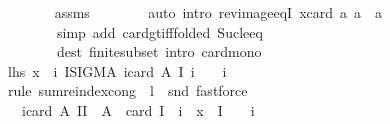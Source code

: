 \begin{isabellebody}
\ \ \ \ \ \ \isamarkupfalse%
\ assms\isanewline
\ \ \ \ \ \ \isamarkupfalse%
\ {\isacharparenleft}{\kern0pt}auto\ intro{\isacharbang}{\kern0pt}{\isacharcolon}{\kern0pt}\ rev{\isacharunderscore}{\kern0pt}image{\isacharunderscore}{\kern0pt}eqI{\isacharbrackleft}{\kern0pt}\ x{\isacharequal}{\kern0pt}{\isachardoublequoteopen}{\isacharparenleft}{\kern0pt}card\ a{\isacharcomma}{\kern0pt}\ a{\isacharparenright}{\kern0pt}{\isachardoublequoteclose}\ \ a{\isacharbrackright}{\kern0pt}\isanewline
\ \ \ \ \ \ \ \ simp\ add{\isacharcolon}{\kern0pt}\ card{\isacharunderscore}{\kern0pt}gt{\isacharunderscore}{\kern0pt}{}{\isacharunderscore}{\kern0pt}iff{\isacharbrackleft}{\kern0pt}folded\ Suc{\isacharunderscore}{\kern0pt}le{\isacharunderscore}{\kern0pt}eq{\isacharbrackright}{\kern0pt}\isanewline
\ \ \ \ \ \ \ \ dest{\isacharcolon}{\kern0pt}\ finite{\isacharunderscore}{\kern0pt}subset\ intro{\isacharcolon}{\kern0pt}\ card{\isacharunderscore}{\kern0pt}mono{\isacharparenright}{\kern0pt}\isanewline
\ \ \ \ \isamarkupfalse%
\ \isamarkupfalse%
\ {\isachardoublequoteopen}{\isacharquery}{\kern0pt}lhs\ x\ {\isacharequal}{\kern0pt}\ {\isacharparenleft}{\kern0pt}{\isasymSum}{\isacharparenleft}{\kern0pt}i{\isacharcomma}{\kern0pt}\ I{\isacharparenright}{\kern0pt}{\isasymin}{\isacharparenleft}{\kern0pt}SIGMA\ i{\isacharcolon}{\kern0pt}{\isacharbraceleft}{\kern0pt}{}{\isachardot}{\kern0pt}{\isachardot}{\kern0pt}card\ A{\isacharbraceright}{\kern0pt}{\isachardot}{\kern0pt}\ {\isacharquery}{\kern0pt}I\ i{\isacharparenright}{\kern0pt}{\isachardot}{\kern0pt}\ {\isacharparenleft}{\kern0pt}{\isacharminus}{\kern0pt}\ {}{\isacharparenright}{\kern0pt}\ {\isacharcircum}{\kern0pt}\ {\isacharparenleft}{\kern0pt}i\ {\isacharplus}{\kern0pt}\ {}{\isacharparenright}{\kern0pt}{\isacharparenright}{\kern0pt}{\isachardoublequoteclose}\isanewline
\ \ \ \ \ \ \isamarkupfalse%
\ {\isacharparenleft}{\kern0pt}rule\ sum{\isachardot}{\kern0pt}reindex{\isacharunderscore}{\kern0pt}cong\ {\isacharbrackleft}{\kern0pt}\ l\ {\isacharequal}{\kern0pt}\ snd{\isacharbrackright}{\kern0pt}{\isacharparenright}{\kern0pt}\ fastforce\isanewline
\ \ \ \ \isamarkupfalse%
\ \isamarkupfalse%
\ {\isachardoublequoteopen}{\isasymdots}\ {\isacharequal}{\kern0pt}\ {\isacharparenleft}{\kern0pt}{\isasymSum}i{\isacharequal}{\kern0pt}{}{\isachardot}{\kern0pt}{\isachardot}{\kern0pt}card\ A{\isachardot}{\kern0pt}\ {\isacharparenleft}{\kern0pt}{\isasymSum}I{\isacharbar}{\kern0pt}I\ {\isasymsubseteq}\ A\ {\isasymand}\ card\ I\ {\isacharequal}{\kern0pt}\ i\ {\isasymand}\ x\ {\isasymin}\ {\isasymInter}I{\isachardot}{\kern0pt}\ {\isacharparenleft}{\kern0pt}{\isacharminus}{\kern0pt}\ {}{\isacharparenright}{\kern0pt}\ {\isacharcircum}{\kern0pt}\ {\isacharparenleft}{\kern0pt}i\ {\isacharplus}{\kern0pt}\ {}{\isacharparenright}{\kern0pt}{\isacharparenright}{\kern0pt}{\isacharparenright}{\kern0pt}{\isachardoublequoteclose}\isanewline

\end{isabellebody}
